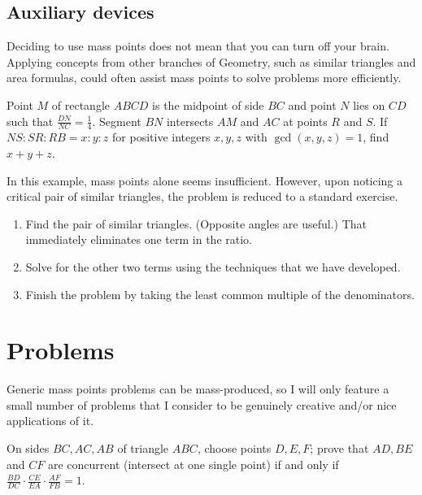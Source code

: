 \documentclass[mast]{lucky}
\begin{document}
\subsection{Auxiliary devices}
Deciding to use mass points does not mean that you can turn off your brain. Applying concepts from other branches of Geometry, such as similar triangles and area formulas, could often assist mass points to solve problems more efficiently.
\begin{exam}[MATHCOUNTS 2012]
Point $M$ of rectangle $ABCD$ is the midpoint of side $BC$ and point $N$ lies on $CD$ such that $\frac{DN}{NC}=\frac{1}{4}$. Segment $BN$ intersects $AM$ and $AC$ at points $R$ and $S$. If $NS:SR:RB = x:y:z$ for positive integers $x,y,z$ with $\gcd(x,y,z)=1$, find $x + y + z$.
\end{exam}
In this example, mass points alone seems insufficient. However, upon noticing a critical pair of similar triangles, the problem is reduced to a standard exercise.

\begin{walk}
\begin{enumerate}
\item Find the pair of similar triangles. (Opposite angles are useful.) That immediately eliminates one term in the ratio.
\item Solve for the other two terms using the techniques that we have developed.
\item Finish the problem by taking the least common multiple of the denominators.
\end{enumerate}
\end{walk}
\section{Problems}
Generic mass points problems can be mass-produced, so I will only feature a small number of problems that I consider to be genuinely creative and/or nice applications of it.

\bigskip
\noindent{}

\begin{req}{2}
\end{req}

\begin{prob}[Ceva]{1}
On sides $BC,AC,AB$ of triangle $ABC$, choose points $D,E,F$; prove that $AD,BE$ and $CF$ are concurrent (intersect at one single point) if and only if $\frac{BD}{DC}\cdot\frac{CE}{EA}\cdot\frac{AF}{FB}=1$.
\end{prob}
\end{document}
